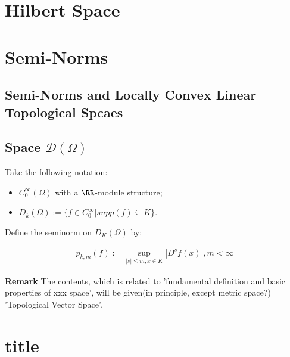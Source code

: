 \documentclass[Total.Tex]{subfiles}
\begin{document}
	\chapter{Hilbert Space}
	\chapter{Semi-Norms}
	
		\section{Semi-Norms and Locally Convex Linear Topological Spcaes}
			
		\section{Space $\mathcal{D}(\Omega)$}
		
		\begin{Def}
			Take the following notation:
			
			\begin{itemize}
				\item $C_0^\infty(\Omega)$ with a $\RR$-module structure;
				\item $D_k(\Omega):=\{f\in C_0^\infty|supp(f)\subseteq K\}$.
			\end{itemize}
			
			Define the seminorm on $D_K(\Omega)$ by:
			
			\begin{gather*}
				p_{k,m}(f):=\sup_{|s|\leq m,x\in K} |D^s f(x)|,m<\infty
			\end{gather*}
		\end{Def}
	\textbf{Remark} The contents, which is related to 'fundamental definition and basic properties of xxx space', will be given(in principle, except metric space?) 'Topological Vector Space'.
	\chapter{title}
\end{document}
